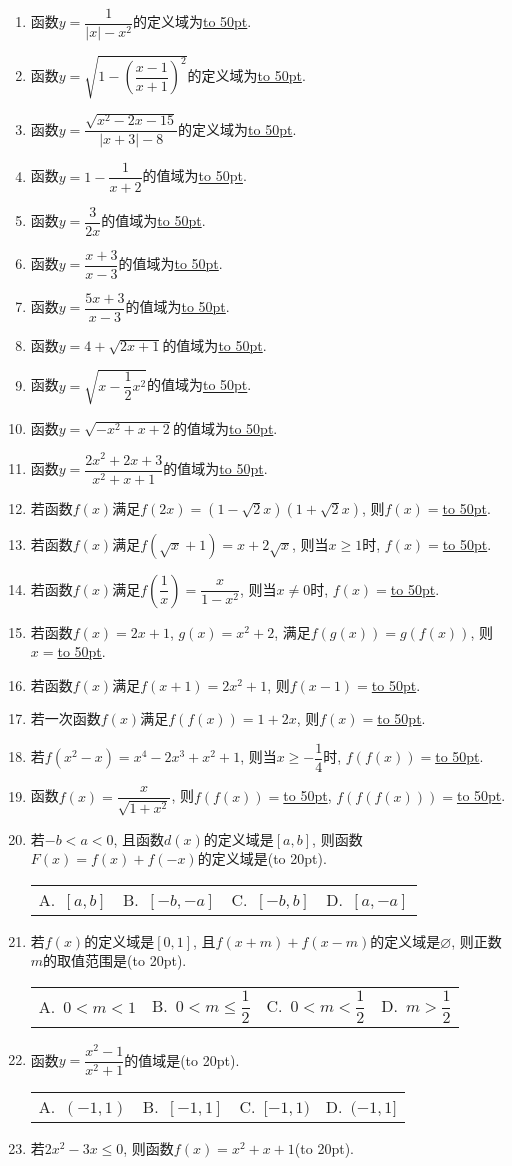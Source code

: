 \documentclass[10pt,a4paper]{article}
\newcommand{\blank}[1]{\underline{\hbox to #1pt{}}}
\newcommand{\bracket}[1]{(\hbox to #1pt{})}
\newcommand{\fourch}[4]{\par\begin{tabular}{p{.23\textwidth}p{.23\textwidth}p{.23\textwidth}p{.23\textwidth}}
A.~#1 &B.~#2& C.~#3& D.~#4
\end{tabular}}
\begin{document}
\begin{enumerate}[1.]
\item 函数$y=\dfrac 1{|x|-x^2}$的定义域为\blank{50}.
\item 函数$y=\sqrt {1-(\dfrac{x-1}{x+1})^2}$的定义域为\blank{50}.
\item 函数$y=\dfrac{\sqrt {x^2-2x-15}}{|x+3|-8}$的定义域为\blank{50}.
\item 函数$y=1-\dfrac 1{x+2}$的值域为\blank{50}.
\item 函数$y=\dfrac 3{2x}$的值域为\blank{50}.
\item 函数$y=\dfrac{x+3}{x-3}$的值域为\blank{50}.
\item 函数$y=\dfrac{5x+3}{x-3}$的值域为\blank{50}.
\item 函数$y=4+\sqrt {2x+1}$的值域为\blank{50}.
\item 函数$y=\sqrt {x-\dfrac 12x^2}$的值域为\blank{50}.
\item 函数$y=\sqrt {-x^2+x+2}$的值域为\blank{50}.
\item 函数$y=\dfrac{2x^2+2x+3}{x^2+x+1}$的值域为\blank{50}.
\item 若函数$f(x)$满足$f(2x)=(1-\sqrt 2x)(1+\sqrt 2x)$, 则$f(x)=$\blank{50}.
\item 若函数$f(x)$满足$f(\sqrt x+1)=x+2\sqrt x$, 则当$x\ge 1$时, $f(x)=$\blank{50}.
\item 若函数$f(x)$满足$f(\dfrac 1x)=\dfrac x{1-x^2}$, 则当$x\ne 0$时, $f(x)=$\blank{50}.
\item 若函数$f(x)=2x+1$, $g(x)=x^2+2$, 满足$f(g(x))=g(f(x))$, 则$x=$\blank{50}.
\item 若函数$f(x)$满足$f(x+1)=2x^2+1$, 则$f(x-1)=$\blank{50}.
\item 若一次函数$f(x)$满足$f(f(x))=1+2x$, 则$f(x)=$\blank{50}.
\item 若$f(x^2-x)=x^4-2x^3+x^2+1$, 则当$x\ge -\dfrac 14$时, $f(f(x))=$\blank{50}.
\item 函数$f(x)=\dfrac x{\sqrt {1+x^2}}$, 则$f(f(x))=$\blank{50}, $f(f(f(x)))=$\blank{50}.
\item 若$-b<a<0$, 且函数$d(x)$的定义域是$[a,b]$, 则函数$F(x)=f(x)+f(-x)$的定义域是\bracket{20}.
\fourch{$[a,b]$}{$[-b,-a]$}{$[-b,b]$}{$[a,-a]$}
\item 若$f(x)$的定义域是$[ 0,1 ]$, 且$f(x+m)+f(x-m)$的定义域是$\varnothing$, 则正数$m$的取值范围是\bracket{20}.
\fourch{$0<m<1$}{$0<m\le \dfrac 12$}{$0<m<\dfrac 12$}{$m>\dfrac 12$}
\item 函数$y=\dfrac{x^2-1}{x^2+1}$的值域是\bracket{20}.
\fourch{$(-1,1)$}{$[-1,1]$}{$[-1,1)$}{$(-1,1]$}
\item 若$2x^2-3x\le 0$, 则函数$f(x)=x^2+x+1$\bracket{20}.

\end{enumerate}
\end{document}
